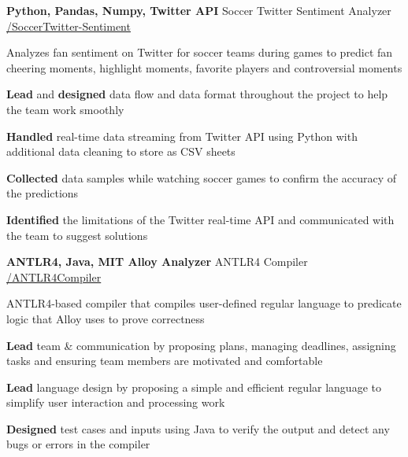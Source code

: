 \begin{cventries}
  \cventry
    {\textbf{Python, Pandas, Numpy, Twitter API}} %
    {Soccer Twitter Sentiment Analyzer} %
    {\href{https://github.com/basulaib/SoccerTwitter-Sentiment}{\faGithub /SoccerTwitter-Sentiment}} %
    {} %
    {
      \begin{cvitems} %
        \item {Analyzes fan sentiment on Twitter for soccer teams during games to predict fan cheering moments, highlight moments, favorite players and controversial moments}
        \item {\textbf{Lead} and \textbf{designed} data flow and data format throughout the project to help the team work smoothly}
        \item {\textbf{Handled} real-time data streaming from Twitter API using Python with additional data cleaning to store as CSV sheets}
        \item {\textbf{Collected} data samples while watching soccer games to confirm the accuracy of the predictions}
        \item {\textbf{Identified} the limitations of the Twitter real-time API and communicated with the team to suggest solutions}
      \end{cvitems}
    }
    

  \cventry
    {\textbf{ANTLR4, Java, MIT Alloy Analyzer}} %
    {ANTLR4 Compiler} %
    {\href{https://github.com/basulaib/ANTLR4Compiler}{\faGithub /ANTLR4Compiler}} %
    {} %
    {
      \begin{cvitems} %
        \item {ANTLR4-based compiler that compiles user-defined regular language to predicate logic that Alloy uses to prove correctness}
        \item {\textbf{Lead} team \& communication by proposing plans, managing deadlines, assigning tasks and ensuring team members are motivated and comfortable}
        \item {\textbf{Lead} language design by proposing a simple and efficient regular language to simplify user interaction and processing work}
        \item {\textbf{Designed} test cases and inputs using Java to verify the output and detect any bugs or errors in the compiler}
      \end{cvitems}
    }
    


\end{cventries}
